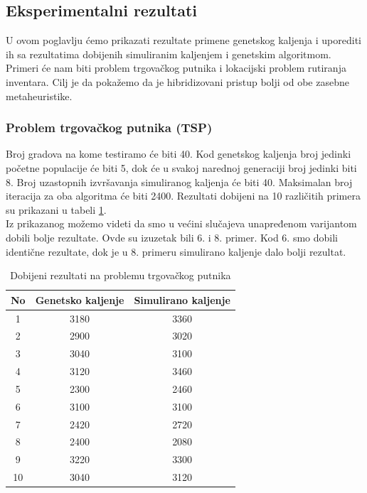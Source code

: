 \documentclass[a4paper]{article}
\begin{document}
\subsection{Eksperimentalni rezultati}

U ovom poglavlju ćemo prikazati rezultate primene genetskog kaljenja i uporediti ih sa rezultatima dobijenih simuliranim kaljenjem i genetskim algoritmom. Primeri će nam biti problem trgovačkog putnika i lokacijski problem rutiranja inventara. Cilj je da pokažemo da je hibridizovani pristup bolji od obe zasebne metaheuristike.   \\ 


\subsubsection{Problem trgovačkog putnika (TSP) \cite{gannealingthesis}}

Broj gradova na kome testiramo će biti 40. Kod genetskog kaljenja broj jedinki početne populacije će biti 5, dok će u svakoj narednoj generaciji broj jedinki biti 8. Broj uzastopnih izvršavanja simuliranog kaljenja će biti 40. Maksimalan broj iteracija za oba algoritma će biti 2400. Rezultati dobijeni na 10 različitih primera su prikazani u tabeli \ref{table:1}. \\ 

Iz prikazanog možemo videti da smo u većini slučajeva unapređenom varijantom dobili bolje rezultate. Ovde su izuzetak bili 6. i 8. primer. Kod 6. smo dobili identične rezultate, dok je u 8. primeru simulirano kaljenje dalo bolji rezultat.

\begin{table}[ht]
\begin{center}
\begin{tabular}{|c|c|c|} \hline
     No & Genetsko kaljenje & Simulirano kaljenje  \\ \hline
     1 &  3180 & 3360 \\ \hline
     2 &  2900 & 3020 \\ \hline
     3 &  3040 & 3100 \\ \hline
     4 &  3120 & 3460 \\ \hline
     5 &  2300 & 2460 \\ \hline
     6 &  3100 & 3100 \\ \hline
     7 &  2420 & 2720 \\ \hline
     8 &  2400 & 2080 \\ \hline
     9 &  3220 & 3300 \\ \hline
     10 & 3040 & 3120 \\ \hline
\end{tabular}
\end{center}
\label{table:1}
\caption{Dobijeni rezultati na problemu trgovačkog putnika}
\end{table}
\end{document}
